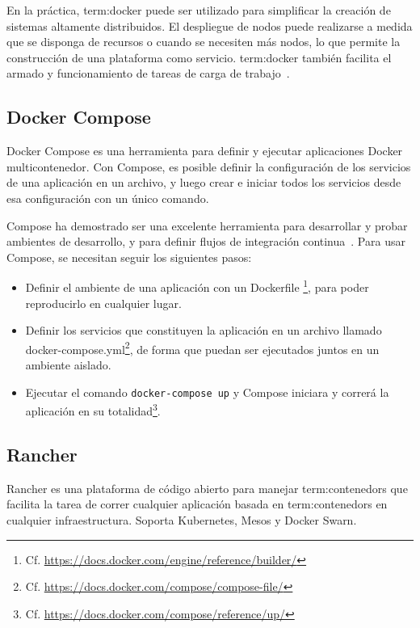 En la práctica, \gls{term:docker} puede ser utilizado para simplificar la
creación de sistemas altamente distribuidos. El despliegue de nodos puede
realizarse a medida que se disponga de recursos o cuando se necesiten más
nodos, lo que permite la construcción de una plataforma como servicio.
\gls{term:docker} también facilita el armado y funcionamiento de tareas de
carga de trabajo~\cite{docker}.

\subsection{Docker Compose}
\label{anexo_compose}

Docker Compose es una herramienta para definir y ejecutar aplicaciones Docker
multicontenedor. Con Compose, es posible definir la configuración de los
servicios de una aplicación en un archivo, y luego crear e iniciar todos los
servicios desde esa configuración con un único comando.

Compose ha demostrado ser una excelente herramienta para desarrollar y probar
ambientes de desarrollo, y para definir flujos de integración
continua~\cite{compose}. Para usar Compose, se necesitan seguir los siguientes
pasos:

\begin{itemize}

  \item
    Definir el ambiente de una aplicación con un Dockerfile
    \footnote{Cf. \url{https://docs.docker.com/engine/reference/builder/}}, para
    poder reproducirlo en cualquier lugar.

  \item
    Definir los servicios que constituyen la aplicación en un archivo llamado
    docker-compose.yml\footnote{Cf. 
    \url{https://docs.docker.com/compose/compose-file/}}, de forma que puedan
    ser ejecutados juntos en un ambiente aislado.

  \item
    Ejecutar el comando \lstinline{docker-compose up} y Compose iniciara y
    correrá la aplicación en su totalidad\footnote{Cf.
    \url{https://docs.docker.com/compose/reference/up/}}.

\end{itemize}

\subsection{Rancher}

Rancher es una plataforma de código abierto para manejar
\glspl{term:contenedor} que facilita la tarea de correr cualquier aplicación
basada en \glspl{term:contenedor} en cualquier infraestructura. Soporta
Kubernetes, Mesos y Docker Swarn.

